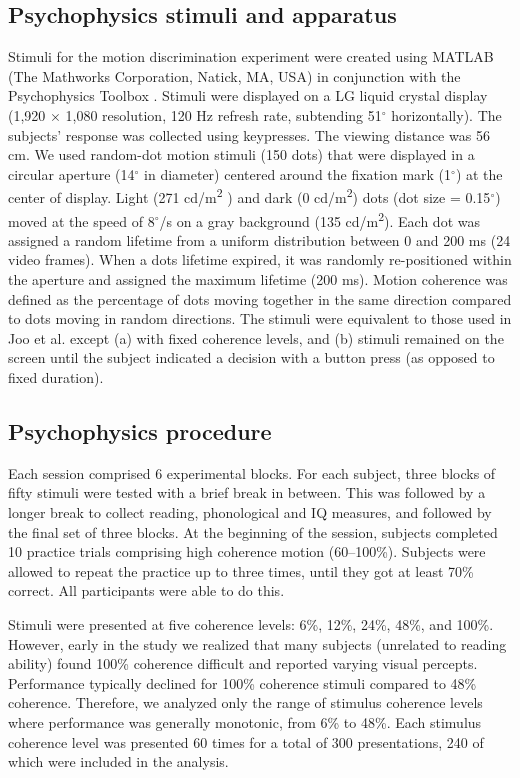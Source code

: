 \documentclass[../uwthesis.tex]{subfiles}
\begin{document}
\subsection{Psychophysics stimuli and apparatus}
Stimuli for the motion discrimination experiment were created using MATLAB (The Mathworks Corporation, Natick, MA, USA) in conjunction with the Psychophysics Toolbox \cite{Brainard1997}. Stimuli were displayed on a LG liquid crystal display (1,920 $\times$ 1,080 resolution, 120 Hz refresh rate, subtending 51$^\circ$ horizontally). The subjects’ response was collected using keypresses. The
viewing distance was 56 cm. We used random-dot motion stimuli (150 dots) that were displayed
in a circular aperture (14$^\circ$ in diameter) centered around the fixation mark (1$^\circ$) at the center of
display. Light (271 cd/m\textsuperscript{2} ) and dark (0 cd/m\textsuperscript{2}) dots (dot size = 0.15$^\circ$) moved at the speed of 8$^\circ$/s on a gray background (135 cd/m\textsuperscript{2}). Each dot was assigned a random lifetime from a uniform distribution between 0 and 200 ms (24 video frames). When a dots lifetime expired, it was randomly re-positioned within the aperture and assigned the maximum lifetime (200 ms). Motion coherence was defined as the percentage of dots moving together in the same direction compared
to dots moving in random directions. The stimuli were equivalent to those used in Joo et al. \cite{Joo2017}
except (a) with fixed coherence levels, and (b) stimuli remained on the screen until the subject indicated a decision with a button press (as opposed to fixed duration).

\subsection{Psychophysics procedure}
Each session comprised 6 experimental blocks. For each subject, three blocks of fifty
stimuli were tested with a brief break in between. This was followed by a longer break to collect
reading, phonological and IQ measures, and followed by the final set of three blocks. At the
beginning of the session, subjects completed 10 practice trials comprising high coherence motion (60–100\%). Subjects were allowed to repeat the practice up to three times, until they got at least 70\% correct. All participants were able to do this.

Stimuli were presented at five coherence levels: 6\%, 12\%, 24\%, 48\%, and 100\%. However, early in the study we realized that many subjects (unrelated to reading ability) found 100\%
coherence difficult and reported varying visual percepts. Performance typically declined for 100\% coherence stimuli compared to 48\% coherence. Therefore, we analyzed only the range of stimulus coherence levels where performance was generally monotonic, from 6\% to 48\%. Each stimulus
coherence level was presented 60 times for a total of 300 presentations, 240 of which were included
in the analysis.
\end{document}
